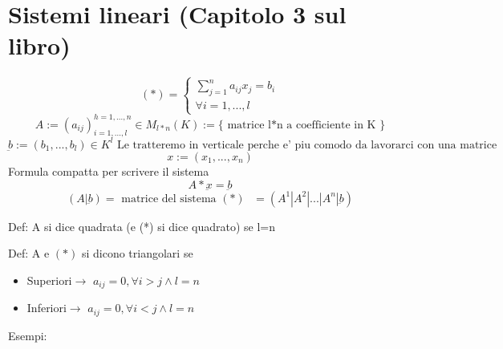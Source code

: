 \documentclass{article}
\begin{document}
\section{Sistemi lineari (Capitolo 3 sul libro)}
\begin{equation*}
  (*)=
  \begin{cases}
    \sum_{j=1}^n a_{ij} x_j = b_i \\
    \forall i=1,...,l
  \end{cases}
\end{equation*}
\begin{equation*}
  A := (a_{ij})^{h=1,...,n}_{i=1,...,l} \in M_{l*n}(K):=\{ \text{ matrice l*n a coefficiente in K } \}
\end{equation*}
\begin{equation*}
  \underbar{b}:=(b_1,...,b_l)\in K^l \text{ Le tratteremo in verticale perche e' piu comodo da lavorarci con una matrice}
\end{equation*}
\begin{equation*}
  x:=(x_1,...,x_n)
\end{equation*}
Formula compatta per scrivere il sistema
\begin{equation*}
  A*\underbar{x}=\underbar{b}
\end{equation*}
\begin{equation*}
  (A|\underbar{b})=\text{ matrice del sistema $(*)$ } = (A^1 | A^2| ... | A^n| \underbar{b})
\end{equation*}
\begin{flushleft}
  Def: A si dice quadrata (e (*) si dice quadrato) se l=n
\end{flushleft}
\begin{flushleft}
  Def: A e $(*)$ si dicono triangolari se
\end{flushleft}
\begin{itemize}
  \item Superiori$\to$ $a_{ij}=0, \forall i>j \land l=n$
  \item Inferiori$\to$ $a_{ij}=0, \forall i<j \land l=n$
\end{itemize}
Esempi:
\end{document}
